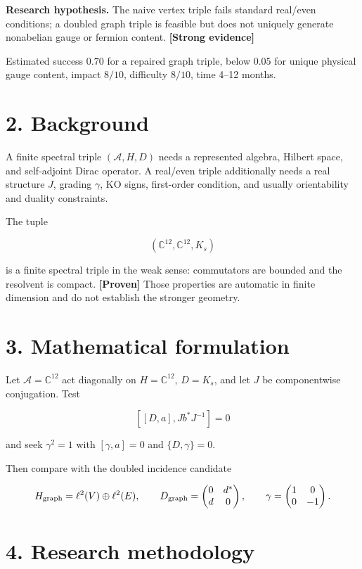 \documentclass[11pt,a4paper,openany]{report}
\newcommand{\statusProven}{\textcolor{fingreen}{[Proven]}}
\newcommand{\statusStrong}{\textcolor{finblue}{[Strong evidence]}}
\begin{document}
\textbf{Research hypothesis.} The naive vertex triple fails standard real/\allowbreak{}even conditions; a doubled graph triple is feasible but does not uniquely generate nonabelian gauge or fermion content. \textbf{\statusStrong{}}

Estimated success \(0.70\) for a repaired graph triple, below \(0.05\) for unique physical gauge content, impact \(8/10\), difficulty \(8/10\), time 4–12 months.

\section{2. Background}

A finite spectral triple \((\mathcal A,H,D)\) needs a represented algebra, Hilbert space, and self-adjoint Dirac operator. A real/\allowbreak{}even triple additionally needs a real structure \(J\), grading \(\gamma\), KO signs, first-order condition, and usually orientability and duality constraints.

The tuple

\[
(\mathbb C^{12},\mathbb C^{12},K_s)
\]

is a finite spectral triple in the weak sense: commutators are bounded and the resolvent is compact. \textbf{\statusProven{}} Those properties are automatic in finite dimension and do not establish the stronger geometry.

\section{3. Mathematical formulation}

Let \(\mathcal A=\mathbb C^{12}\) act diagonally on \(H=\mathbb C^{12}\), \(D=K_s\), and let \(J\) be componentwise conjugation. Test

\[
[[D,a],Jb^*J^{-1}]=0
\]

and seek \(\gamma^2=1\) with \([\gamma,a]=0\) and \(\{D,\gamma\}=0\).

Then compare with the doubled incidence candidate

\[
H_{\rm graph}=\ell^2(V)\oplus\ell^2(E),\qquad
D_{\rm graph}=
\begin{pmatrix}0&d^*\\ d&0\end{pmatrix},
\qquad
\gamma=\begin{pmatrix}1&0\\0&-1\end{pmatrix}.
\]

\section{4. Research methodology}
\end{document}
